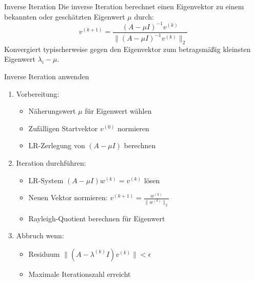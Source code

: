 \begin{concept}{Inverse Iteration}
Die inverse Iteration berechnet einen Eigenvektor zu einem bekannten oder geschätzten Eigenwert $\mu$ durch:
$$v^{(k+1)} = \frac{(A-\mu I)^{-1}v^{(k)}}{\|(A-\mu I)^{-1}v^{(k)}\|_2}$$
Konvergiert typischerweise gegen den Eigenvektor zum betragsmäßig kleinsten Eigenwert $\lambda_i - \mu$.
\end{concept}

\begin{KR}{Inverse Iteration anwenden}
\begin{enumerate}
    \item Vorbereitung:
    \begin{itemize}
        \item Näherungswert $\mu$ für Eigenwert wählen
        \item Zufälligen Startvektor $v^{(0)}$ normieren 
        \item LR-Zerlegung von $(A-\mu I)$ berechnen
    \end{itemize}
    
    \item Iteration durchführen:
    \begin{itemize}
        \item LR-System $(A-\mu I)w^{(k)} = v^{(k)}$ lösen
        \item Neuen Vektor normieren: $v^{(k+1)} = \frac{w^{(k)}}{\|w^{(k)}\|_2}$
        \item Rayleigh-Quotient berechnen für Eigenwert
    \end{itemize}
    
    \item Abbruch wenn:
    \begin{itemize}
        \item Residuum $\|(A-\lambda^{(k)}I)v^{(k)}\| < \epsilon$
        \item Maximale Iterationszahl erreicht
    \end{itemize}
\end{enumerate}
\end{KR}

